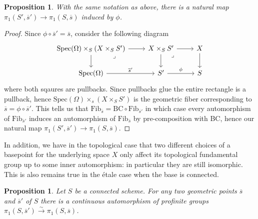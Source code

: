 \documentclass{article}
\theoremstyle{definition}
\theoremstyle{remark}
\theoremstyle{plain}
\newtheorem{proposition}[theorem]{Proposition}
\begin{document}
\begin{proposition}
	With the same notation as above, there is a natural map $\pi_1(S', \overline{s}') \to \pi_1(S, \overline{s})$ induced by $\phi$.
\end{proposition}

\begin{proof}
Since $\phi \circ \overline{s}' = \overline{s}$, consider the following diagram 
\[\begin{tikzcd}
	{\text{Spec}(\Omega) \times_S (X \times _S S')} & {X\times_S S'} & X \\
	{\text{Spec}(\Omega)} & {S'} & S
	\arrow[from=1-1, to=1-2]
	\arrow[from=1-1, to=2-1]
	\arrow["\lrcorner"{anchor=center, pos=0.125}, draw=none, from=1-1, to=2-2]
	\arrow[from=1-2, to=1-3]
	\arrow[from=1-2, to=2-2]
	\arrow["\lrcorner"{anchor=center, pos=0.125}, draw=none, from=1-2, to=2-3]
	\arrow[from=1-3, to=2-3]
	\arrow["{\overline{s}'}", from=2-1, to=2-2]
	\arrow["\phi", from=2-2, to=2-3]
\end{tikzcd}\]
 where both sqaures are pullbacks. 
 Since pullbacks glue the entire rectangle is a pullback, hence $\text{Spec}(\Omega) \times_s (X \times_S S')$ is the geometric fiber corresponding to $\overline{s} = \phi \circ \overline{s}'$.
This tells us that $\text{Fib}_{\overline{s}} = \text{BC} \circ \text{Fib}_{\overline{s}'}$ in which case every automorphism of $\text{Fib}_{\overline{s}'}$ induces an automorphism of $\text{Fib}_{\overline{s}}$ by pre-composition with BC, hence our natural map $\pi_1(S', \overline{s}') \to \pi_1(S, \overline{s})$.
\end{proof}

In addition, we have in the topological case that two different choices of a basepoint for the underlying space $X$ only affect its topological fundamental group up to some inner automorphism: in particular they are still isomorphic.
This is also remains true in the \'etale case when the base is connected.

\begin{proposition}
	Let $S$ be a connected scheme.
	For any two geometric points $\overline{s}$ and $\overline{s}'$ of $S$ there is a continuous automorphism of profinite groups $\pi_1(S, \overline{s}') \xrightarrow{\sim} \pi_1(S, \overline{s})$. 
\end{proposition}
\end{document}
